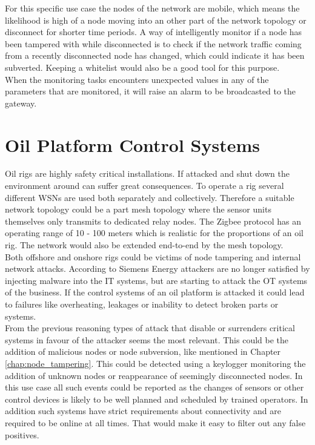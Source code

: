 For this specific use case the nodes of the network are mobile, which means the likelihood is high of a node moving into an other part of the network topology or disconnect for shorter time periods. A way of intelligently monitor if a node has been tampered with while disconnected is to check if the network traffic coming from a recently disconnected node has changed, which could indicate it has been subverted. Keeping a whitelist would also be a good tool for this purpose.\\

When the monitoring tasks encounters unexpected values in any of the parameters that are monitored, it will raise an alarm to be broadcasted to the gateway.


\section{Oil Platform Control Systems}

Oil rigs are highly safety critical installations. If attacked and shut down the environment around can suffer great consequences. To operate a rig several different WSNs are used both separately and collectively. Therefore a suitable network topology could be a part mesh topology where the sensor units themselves only transmits to dedicated relay nodes. The Zigbee protocol has an operating range of 10 - 100 meters which is realistic for the proportions of an oil rig. The network would also be extended end-to-end by the mesh topology. \\

Both offshore and onshore rigs could be victims of node tampering and internal network attacks. According to Siemens Energy\cite{cyber-attacks_oil} attackers are no longer satisfied by injecting malware into the IT systems, but are starting to attack the OT systems of the business. If the control systems of an oil platform is attacked it could lead to failures like overheating, leakages or inability to detect broken parts or systems. \\

From the previous reasoning types of attack that disable or surrenders critical systems in favour of the attacker seems the most relevant. This could be the addition of malicious nodes or node subversion, like mentioned in Chapter \ref{chap:node_tampering}. This could be detected using a keylogger monitoring the addition of unknown nodes or reappearance of seemingly disconnected nodes. In this use case all such events could be reported as the changes of sensors or other control devices is likely to be well planned and scheduled by trained operators. In addition such systems have strict requirements about connectivity and are required to be online at all times. That would make it easy to filter out any false positives.\\


